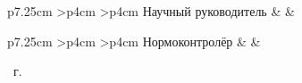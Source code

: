 \begin{titlepage}
\begin{table}[h!]
		\vspace{\baselineskip}
        \vspace{\baselineskip}
		
		\begin{signstabular}[0.7]{p{7.25cm} >{\centering\arraybackslash}p{4cm} >{\centering\arraybackslash}p{4cm}}
			Научный руководитель  & 
            \signaturefield & 
             \\
		\end{signstabular}

        \vspace{\baselineskip}
        \vspace{\baselineskip}

        \begin{signstabular}[0.7]{p{7.25cm} >{\centering\arraybackslash}p{4cm} >{\centering\arraybackslash}p{4cm}}
			Нормоконтролёр  & 
            \signaturefield & 
            \emptysignfield \\
		\end{signstabular}

        \vspace{\baselineskip}
        \vspace{\baselineskip}
		
		\vspace{\baselineskip}
	\end{table}
	
	\begin{center}
		\vfill
		\the\year~г.
	\end{center}
	\restoregeometry
\end{titlepage}